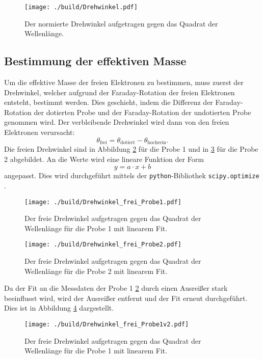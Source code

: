 \begin{figure}[H]
  \centering
  \texttt{[image: ./build/Drehwinkel.pdf]}
  \caption{Der normierte Drehwinkel aufgetragen gegen das Quadrat der Wellenlänge.}
  \label{fig:drehwinkel}
\end{figure}

\subsection{Bestimmung der effektiven Masse}
\label{subsec:effektiveMasse}
Um die effektive Masse der freien Elektronen zu bestimmen, muss zuerst der Drehwinkel,
welcher aufgrund der Faraday-Rotation der freien Elektronen entsteht, bestimmt werden.
Dies geschieht, indem die Differenz der Faraday-Rotation der dotierten Probe und der
Faraday-Rotation der undotierten Probe genommen wird. Der verbleibende Drehwinkel
wird dann von den freien Elektronen verursacht:
\begin{equation}
  \theta_{\text{frei}} = \theta_{\text{dotiert}} - \theta_{\text{hochrein}}.
  \label{eqn:berechnungfrei}
\end{equation}
Die freien Drehwinkel sind in Abbildung \ref{fig:frei1} für die Probe 1 und in
\ref{fig:frei2} für die Probe 2 abgebildet. An die Werte wird eine lineare
Funktion der Form
\begin{equation}
  y = a \cdot x + b
  \label{eqn:linearerfit}
\end{equation}
angepasst. Dies wird durchgeführt mittels der \texttt{python}-Bibliothek \texttt{scipy.optimize} \cite{scipy}.
\begin{figure}[H]
  \centering
  \texttt{[image: ./build/Drehwinkel\_frei\_Probe1.pdf]}
  \caption{Der freie Drehwinkel aufgetragen gegen das Quadrat der Wellenlänge für die Probe 1 mit linearem Fit.}
  \label{fig:frei1}
\end{figure}
\noindent
\begin{figure}[H]
  \centering
  \texttt{[image: ./build/Drehwinkel\_frei\_Probe2.pdf]}
  \caption{Der freie Drehwinkel aufgetragen gegen das Quadrat der Wellenlänge für die Probe 2 mit linearem Fit.}
  \label{fig:frei2}
\end{figure}
\noindent
Da der Fit an die Messdaten der Probe 1 \ref{fig:frei1} durch einen Ausreißer
stark beeinflusst wird, wird der Ausreißer entfernt und der Fit erneut durchgeführt.
Dies ist in Abbildung \ref{fig:frei1v2} dargestellt.
\begin{figure}[H]
  \centering
  \texttt{[image: ./build/Drehwinkel\_frei\_Probe1v2.pdf]}
  \caption{Der freie Drehwinkel aufgetragen gegen das Quadrat der Wellenlänge für die Probe 1 mit linearem Fit.}
  \label{fig:frei1v2}
\end{figure}
